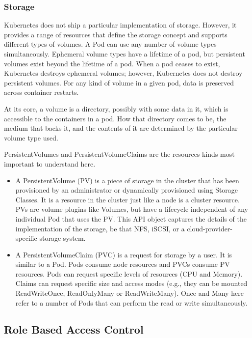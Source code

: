 \subsubsection*{Storage}

Kubernetes does not ship a particular implementation of storage. However, it provides a range of resources that define the storage concept and supports different types of volumes. A Pod can use any number of volume types simultaneously. Ephemeral volume types have a lifetime of a pod, but persistent volumes exist beyond the lifetime of a pod. When a pod ceases to exist, Kubernetes destroys ephemeral volumes; however, Kubernetes does not destroy persistent volumes. For any kind of volume in a given pod, data is preserved across container restarts.

At its core, a volume is a directory, possibly with some data in it, which is accessible to the containers in a pod. How that directory comes to be, the medium that backs it, and the contents of it are determined by the particular volume type used.

PersistentVolumes and PersistentVolumeClaims are the resources kinds most important to understand here.
\begin{itemize}
\item A PersistentVolume (PV) is a piece of storage in the cluster that has been provisioned by an administrator or dynamically provisioned using Storage Classes. It is a resource in the cluster just like a node is a cluster resource. PVs are volume plugins like Volumes, but have a lifecycle independent of any individual Pod that uses the PV. This API object captures the details of the implementation of the storage, be that NFS, iSCSI, or a cloud-provider-specific storage system.
\item A PersistentVolumeClaim (PVC) is a request for storage by a user. It is similar to a Pod. Pods consume node resources and PVCs consume PV resources. Pods can request specific levels of resources (CPU and Memory). Claims can request specific size and access modes (e.g., they can be mounted ReadWriteOnce, ReadOnlyMany or ReadWriteMany). Once and Many here refer to a number of Pods that can perform the read or write simultaneously.
\end{itemize}

\subsection{Role Based Access Control}

